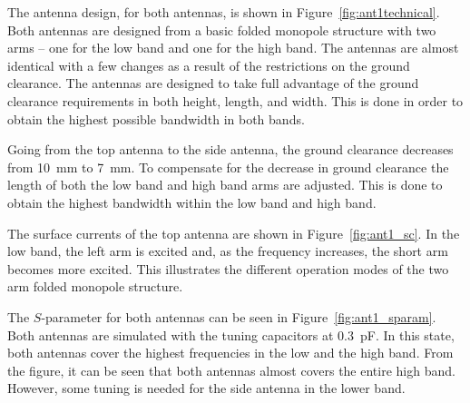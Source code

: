 The antenna design, for both antennas, is shown in Figure~\ref{fig:ant1technical}. Both antennas are designed from a basic folded monopole structure with two arms -- one for the low band and one for the high band. The antennas are almost identical with a few changes as a result of the restrictions on the ground clearance.
The antennas are designed to take full advantage of the ground clearance requirements in both height, length, and width. This is done in order to obtain the highest possible bandwidth in both bands. 

Going from the top antenna to the side antenna, the ground clearance decreases from \SI{10}{mm} to \SI{7}{mm}. To compensate for the decrease in ground clearance the length of both the low band and high band arms are adjusted. This is done to obtain the highest bandwidth within the low band and high band. 

The surface currents of the top antenna are shown in Figure~\ref{fig:ant1_sc}. In the low band, the left arm is excited and, as the frequency increases, the short arm becomes more excited. This illustrates the different operation modes of the two arm folded monopole structure.

The $S$-parameter for both antennas can be seen in Figure~\ref{fig:ant1_sparam}. Both antennas are simulated with the tuning capacitors at \SI{0.3}{pF}. In this state, both antennas cover the highest frequencies in the low and the high band. From the figure, it can be seen that both antennas almost covers the entire high band. However, some tuning is needed for the side antenna in the lower band.

